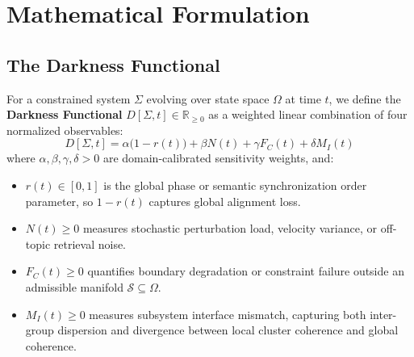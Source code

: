 \documentclass[11pt,twocolumn]{article}
\begin{document}
\section{Mathematical Formulation}

\subsection{The Darkness Functional}
For a constrained system $\Sigma$ evolving over state space $\Omega$ at time $t$, we define the \textbf{Darkness Functional} $D[\Sigma, t] \in \mathbb{R}_{\ge 0}$ as a weighted linear combination of four normalized observables:
\begin{equation}
D[\Sigma, t] = \alpha\bigl(1 - r(t)\bigr) + \beta N(t) + \gamma F_C(t) + \delta M_I(t)
\label{eq:darkness}
\end{equation}
where $\alpha, \beta, \gamma, \delta > 0$ are domain-calibrated sensitivity weights, and:
\begin{itemize}
    \item $r(t) \in [0, 1]$ is the global phase or semantic synchronization order parameter, so $1 - r(t)$ captures global alignment loss.
    \item $N(t) \ge 0$ measures stochastic perturbation load, velocity variance, or off-topic retrieval noise.
    \item $F_C(t) \ge 0$ quantifies boundary degradation or constraint failure outside an admissible manifold $\mathcal{S} \subseteq \Omega$.
    \item $M_I(t) \ge 0$ measures subsystem interface mismatch, capturing both inter-group dispersion and divergence between local cluster coherence and global coherence.
\end{itemize}
\end{document}
